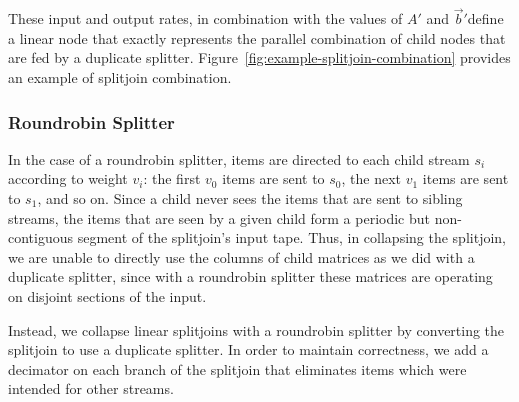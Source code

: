 {These input and output rates, in combination with the values of $A'$
and $\vec{b}'$define a linear node that exactly represents the
parallel combination of child nodes that are fed by a duplicate
splitter. Figure~\ref{fig:example-splitjoin-combination} provides an
example of splitjoin combination.



\subsubsection{Roundrobin Splitter}

In the case of a roundrobin splitter, items are directed to each child
stream $s_i$ according to weight $v_i$: the first $v_0$ items are sent
to $s_0$, the next $v_1$ items are sent to $s_1$, and so on.  Since a
child never sees the items that are sent to sibling streams, the items
that are seen by a given child form a periodic but non-contiguous
segment of the splitjoin's input tape.  Thus, in collapsing the
splitjoin, we are unable to directly use the columns of child matrices
as we did with a duplicate splitter, since with a roundrobin splitter
these matrices are operating on disjoint sections of the input.

Instead, we collapse linear splitjoins with a roundrobin splitter by
converting the splitjoin to use a duplicate splitter.  In order to
maintain correctness, we add a decimator on each branch
of the splitjoin that eliminates items which were intended for other
streams.

}

